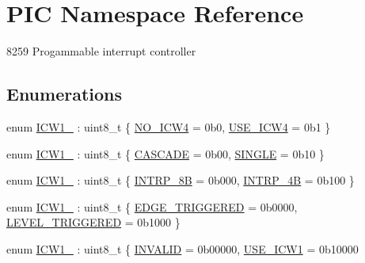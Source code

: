 \hypertarget{namespace_p_i_c}{}\section{P\+IC Namespace Reference}
\label{namespace_p_i_c}


8259 Progammable interrupt controller  


\subsection*{Enumerations}
\begin{DoxyCompactItemize}
\item 
enum \hyperlink{namespace_p_i_c_ad77e5a651b62733bf36c78c7d9f97ab8}{I\+C\+W1\+\_} \+: uint8\+\_\+t \{ \hyperlink{namespace_p_i_c_ad77e5a651b62733bf36c78c7d9f97ab8a7be367dd0bbb526a427aa0acd3b93c36}{N\+O\+\_\+\+I\+C\+W4} = 0b0, 
\hyperlink{namespace_p_i_c_ad77e5a651b62733bf36c78c7d9f97ab8a010def85bd8ce09fdbb9240d7a892279}{U\+S\+E\+\_\+\+I\+C\+W4} = 0b1
 \}
\item 
enum \hyperlink{namespace_p_i_c_ac4d1fffbe7319dc6a5143adbdfe13652}{I\+C\+W1\+\_} \+: uint8\+\_\+t \{ \hyperlink{namespace_p_i_c_ac4d1fffbe7319dc6a5143adbdfe13652a2e57be26f8e434f012153663faa5deff}{C\+A\+S\+C\+A\+DE} = 0b00, 
\hyperlink{namespace_p_i_c_ac4d1fffbe7319dc6a5143adbdfe13652a2d23da318af8d6feac77e5a6ce06ac48}{S\+I\+N\+G\+LE} = 0b10
 \}
\item 
enum \hyperlink{namespace_p_i_c_a70511ba78097aa4bf39435ae9eda4033}{I\+C\+W1\+\_} \+: uint8\+\_\+t \{ \hyperlink{namespace_p_i_c_a70511ba78097aa4bf39435ae9eda4033a241b3b87fa30c6a81bc169b8f03da9c9}{I\+N\+T\+R\+P\+\_\+8B} = 0b000, 
\hyperlink{namespace_p_i_c_a70511ba78097aa4bf39435ae9eda4033a7ee3995b2488d2942cea68b9dced4442}{I\+N\+T\+R\+P\+\_\+4B} = 0b100
 \}
\item 
enum \hyperlink{namespace_p_i_c_a6c8d5577b7e939d025ef7b9d1ada39e6}{I\+C\+W1\+\_} \+: uint8\+\_\+t \{ \hyperlink{namespace_p_i_c_a6c8d5577b7e939d025ef7b9d1ada39e6a15ef41d5ed02434814d1bfd5595f6163}{E\+D\+G\+E\+\_\+\+T\+R\+I\+G\+G\+E\+R\+ED} = 0b0000, 
\hyperlink{namespace_p_i_c_a6c8d5577b7e939d025ef7b9d1ada39e6aff60e2f0839923e87eea5d6b79741823}{L\+E\+V\+E\+L\+\_\+\+T\+R\+I\+G\+G\+E\+R\+ED} = 0b1000
 \}
\item 
enum \hyperlink{namespace_p_i_c_ae14d96313460425ec0afd69c1170cb2f}{I\+C\+W1\+\_} \+: uint8\+\_\+t \{ \hyperlink{namespace_p_i_c_ae14d96313460425ec0afd69c1170cb2fa35d3de94a12ead580e4edcf7a6f63e6e}{I\+N\+V\+A\+L\+ID} = 0b00000, 
\hyperlink{namespace_p_i_c_ae14d96313460425ec0afd69c1170cb2fab62a61042a91e8a797cf0d9c2a9e330e}{U\+S\+E\+\_\+\+I\+C\+W1} = 0b10000

\end{DoxyCompactItemize}
